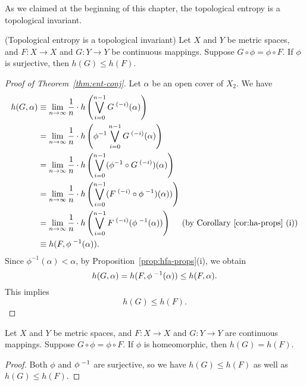 \documentclass[10pt,twoside,draft]{book}
\begin{document}
As we claimed at the beginning of this chapter, the topological entropy is a topological invariant.
\begin{theorem}
  (Topological entropy is a topological invariant)
  Let $X$ and $Y$ be metric spaces, and $F: X \to X$ and $G: Y \to Y$ be continuous mappings.
  Suppose $G\circ \phi = \phi \circ F$.
  If $\phi$ is surjective, then $h(G) \leq h(F)$.
  \label{thm:ent-conj}
  \begin{proof}[Proof of Theorem~\ref{thm:ent-conj}]
    Let $\alpha$ be an open cover of $X_2$.
    We have
    \begin{align*}
      h(G, \alpha)
      &\equiv \lim\limits_{n \to \infty} \frac{1}{n} \cdot h \left ( \bigvee\limits_{i = 0}^{n-1} G^{\;(-i)}(\alpha) \right ) \\
      &= \lim\limits_{n \to \infty} \frac{1}{n} \cdot h \left ( \phi^{-1} \bigvee\limits_{i = 0}^{n-1} G^{\;(-i)} (\alpha) \right ) \\
      &= \lim\limits_{n \to \infty} \frac{1}{n} \cdot h \left ( \bigvee\limits_{i = 0}^{n-1} (\phi^{-1} \circ G^{\;(-i)}) (\alpha) \right ) \\
      &= \lim\limits_{n \to \infty} \frac{1}{n} \cdot h \left (  \bigvee\limits_{i = 0}^{n-1} (F^{\;(-i)} \circ \phi^{\;-1}) (\alpha)) \right ) \\
      &= \lim\limits_{n \to \infty} \frac{1}{n} \cdot h \left ( \bigvee\limits_{i = 0}^{n-1} F^{\;(-i)} (\phi^{\;-1} (\alpha)) \right ) \quad\mbox{ (by Corollary~\ref{cor:ha-props} (i))} \\
      &\equiv h(F, \phi^{\;-1}(\alpha)).
    \end{align*}
    Since $\phi^{-1}(\alpha) < \alpha$, by Proposition~\ref{prop:hfa-props}(i), we obtain
    \begin{equation*}
      h(G,\alpha) 
      = h(F,\phi^{\;-1}(\alpha))
      \leq h(F, \alpha).
    \end{equation*}
    This implies
    \begin{equation*}
      h(G) \leq h(F).
    \end{equation*}
  \end{proof}
\end{theorem}
\begin{corollary}
  Let $X$ and $Y$ be metric spaces, and $F: X \to X$ and $G: Y \to Y$ are continuous mappings.
  Suppose $G\circ \phi = \phi \circ F$.
  If $\phi$ is homeomorphic, then $h(G) = h(F)$.
\begin{proof}
  Both $\phi$ and $\phi^{\;-1}$ are surjective, so we have $h(G) \leq h(F)$ as well as $h(G) \leq h(F)$.
\end{proof}
\end{corollary}
\end{document}
